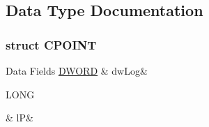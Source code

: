 \subsection{Data Type Documentation}
\label{d2/d79/a00051}
\hypertarget{a00003_d2/d79/a00051}{}
\subsubsection{struct C\-P\-O\-I\-N\-T}
\begin{DoxyFields}{Data Fields}
\hypertarget{a00003_acc646aee00e4e486e35024c324cf4567}{\hyperlink{a00003_a50e15ae51c87ae06ab29c8148cb5f36c}{D\-W\-O\-R\-D}}\label{a00003_acc646aee00e4e486e35024c324cf4567}
&
dw\-Log&
\\
\hline

\hypertarget{a00003_a0e786ef8e7aebd5c006f4819d4c6d72c}{L\-O\-N\-G}\label{a00003_a0e786ef8e7aebd5c006f4819d4c6d72c}
&
l\-P&
\\
\hline

\end{DoxyFields}
\label{dc/dee/a00053}
\hypertarget{a00003_dc/dee/a00053}{}
